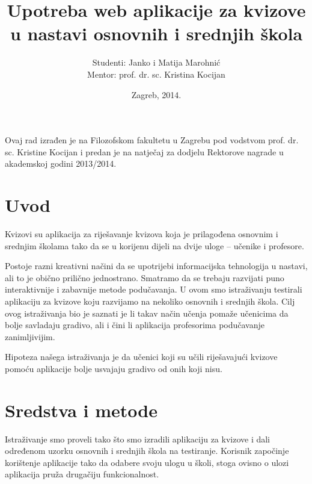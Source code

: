 \documentclass{scrreprt}
\begin{document}
\titlehead{Sveučilište u Zagrebu\\Filozofski fakultet\\Odsijek za informacijske
i komunikacijske znanosti\\Akademska godina 2013/14.}
\title{Upotreba web aplikacije za kvizove u nastavi osnovnih i srednjih škola}
\author{Studenti: Janko i Matija Marohnić\\Mentor: prof. dr. sc. Kristina
Kocijan}
\date{Zagreb, 2014.}

\maketitle

\pagebreak

Ovaj rad izrađen je na Filozofskom fakultetu u Zagrebu pod vodstvom prof. dr.
sc. Kristine Kocijan i predan je na natječaj za dodjelu Rektorove nagrade u
akademskoj godini 2013/2014.

\pagebreak

\tableofcontents

\chapter{Uvod}

Kvizovi su aplikacija za riješavanje kvizova koja je prilagođena osnovnim i
srednjim školama tako da se u korijenu dijeli na dvije uloge -- učenike i
profesore.

Postoje razni kreativni načini da se upotrijebi informacijska tehnologija u
nastavi, ali to je obično prilično jednostrano. Smatramo da se trebaju razvijati
puno interaktivnije i zabavnije metode podučavanja. U ovom smo istraživanju
testirali aplikaciju za kvizove koju razvijamo na nekoliko osnovnih i srednjih
škola. Cilj ovog istraživanja bio je saznati je li takav način učenja pomaže
učenicima da bolje savladaju gradivo, ali i čini li aplikacija profesorima
podučavanje zanimljivijim.

Hipoteza našega istraživanja je da učenici koji su učili riješavajući kvizove
pomoću aplikacije bolje usvajaju gradivo od onih koji nisu.

\chapter{Sredstva i metode}

Istraživanje smo proveli tako što smo izradili aplikaciju za kvizove i dali
određenom uzorku osnovnih i srednjih škola na testiranje. Korisnik započinje
korištenje aplikacije tako da odabere svoju ulogu u školi, stoga ovisno o ulozi
aplikacija pruža drugačiju funkcionalnost.
\end{document}
